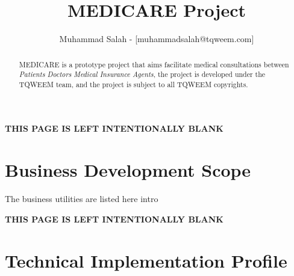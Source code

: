 \documentclass[class=article, crop=false]{standalone}
\title{
    MEDICARE Project
}
\author{
    Muhammad Salah - [muhammadsalah@tqweem.com]
}
\begin{document}
    \clearpage
    \maketitle
    \thispagestyle{empty}
    \newpage
    \setcounter{page}{1}
    \begin{abstract}
    MEDICARE is a prototype project that aims facilitate medical consultations between \emph{Patients} \emph{Doctors}
    \emph{Medical Insurance Agents}, the project is developed under the TQWEEM\cite{TQWEEM} team, and the project is subject
    to all TQWEEM\cite{TQWEEM} copyrights.

    \end{abstract}
    \newpage
    \tableofcontents
    \newpage
    \listoffigures
    \newpage
    \listoftables
    \newpage


    \thispagestyle{empty}
    \vspace*{\fill}
    \begin{center}
        \textbf{
            \uppercase{this page is left intentionally blank}
        }
    \end{center}
    \vspace*{\fill}

    \newpage
    \setcounter{page}{1}
    \part{Business Development Scope}
    The business utilities are listed here
    \newpage
    {intro}

    \newpage
    \thispagestyle{empty}
    \vspace*{\fill}
    \begin{center}
        \textbf{
            \uppercase{this page is left intentionally blank}
        }
    \end{center}
    \vspace*{\fill}
    \newpage
    \part{Technical Implementation Profile}

    \newpage

    \newpage
    \setcounter{page}{1}
    
    
\end{document}
